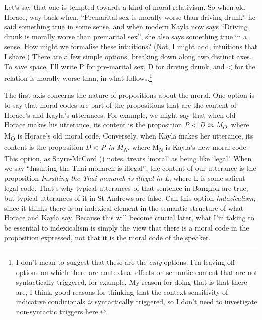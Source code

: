 \documentclass[
  10pt,
  letterpaper,
  DIV=11,
  numbers=noendperiod,
  twoside]{scrartcl}
\begin{document}
Let's say that one is tempted towards a kind of moral relativism. So
when old Horace, way back when, ``Premarital sex is morally worse than
driving drunk'' he said something true in some sense, and when modern
Kayla now says ``Driving drunk is morally worse than premarital sex'',
she also says something true in a sense. How might we formalise these
intuitions? (Not, I might add, intuitions that I share.) There are a few
simple options, breaking down along two distinct axes. To save space,
I'll write P for pre-marital sex, D for driving drunk, and \textless{}
for the relation is morally worse than, in what follows.\footnote{I
  don't mean to suggest that these are the \emph{only} options. I'm
  leaving off options on which there are contextual effects on semantic
  content that are not syntactically triggered, for example. My reason
  for doing that is that there are, I think, good reasons for thinking
  that the context-sensitivity of indicative conditionals \emph{is}
  syntactically triggered, so I don't need to investigate non-syntactic
  triggers here.}

The first axis concerns the nature of propositions about the moral. One
option is to say that moral codes are part of the propositions that are
the content of Horace's and Kayla's utterances. For example, we might
say that when old Horace makes his utterance, its content is the
proposition \emph{P} \textless{} \emph{D in M\textsubscript{O}}, where
M\textsubscript{O} is Horace's old moral code. Conversely, when Kayla
makes her utterance, its content is the proposition \emph{D} \textless{}
\emph{P in M\textsubscript{N}}. where M\textsubscript{N} is Kayla's new
moral code. This option, as Sayre-McCord
() notes, treats `moral' as being
like `legal'. When we say ``Insulting the Thai monarch is illegal'', the
content of our utterance is the proposition \emph{Insulting the Thai
monarch is illegal in L}, where L is some salient legal code. That's why
typical utterances of that sentence in Bangkok are true, but typical
utterances of it in St Andrews are false. Call this option
\emph{indexicalism}, since it thinks there is an indexical element in
the semantic structure of what Horace and Kayla say. Because this will
become crucial later, what I'm taking to be essential to indexicalism is
simply the view that there is a moral code in the proposition expressed,
not that it is the moral code of the speaker.
\end{document}
